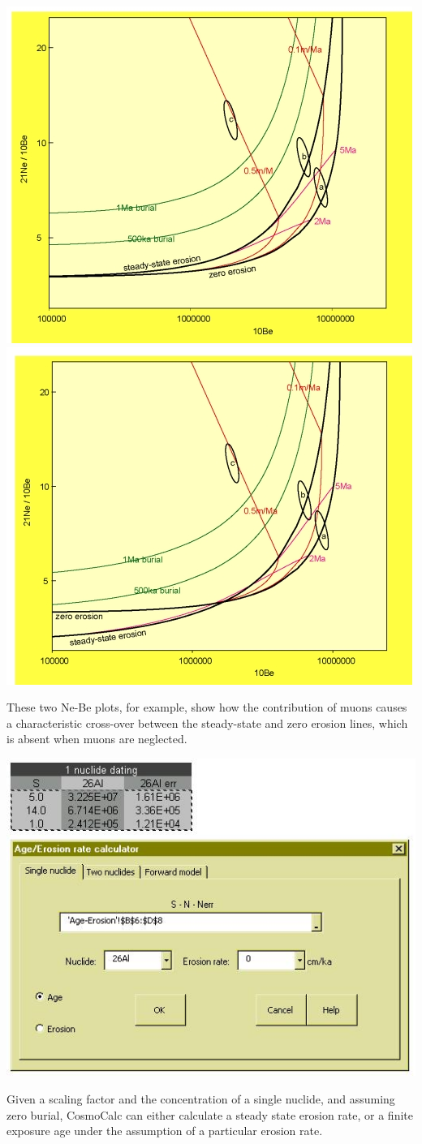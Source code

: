 \documentclass[12pt]{article}
\begin{document}
\begin{minipage}[tbp]{\textwidth}
\begin{center}
  \includegraphics[width=.49\textwidth]{NeBeBananaWithoutMuonsSmall.jpg}
  \includegraphics[width=.49\textwidth]{NeBeBananaWithMuonsSmall.jpg}\\
\end{center}
  These two  Ne-Be plots,  for example, show  how the  contribution of
  muons  causes a characteristic  cross-over between  the steady-state
  and zero erosion lines, which is absent when muons are neglected.
  \\
\end{minipage}

\begin{minipage}[tbp]{\textwidth}
  \begin{center}
  \includegraphics[width=.6\textwidth]{singleNuclideAge.jpg}\\
  \end{center}
  Given a  scaling factor and  the concentration of a  single nuclide,
  and assuming  zero burial, CosmoCalc  can either calculate  a steady
  state erosion rate, or a finite exposure age under the assumption of
  a particular erosion rate.
  \\
\end{minipage}
\end{document}
